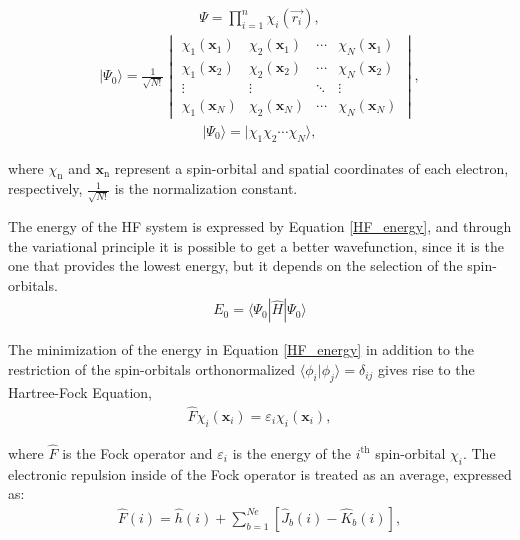 \begin{align}
  \Psi = \prod_{i=1}^{n} \chi_i (\vec{r_i}) ,
  \label{Aprox_Orb}
\end{align}
\begin{align}
  |\Psi_0\rangle = \frac{1}{\sqrt{N!}}
  \begin{vmatrix}
    \chi_{1}(\mathbf{x}_1) & \chi_{2}(\mathbf{x}_1) & \cdots & \chi_{N}(\mathbf{x}_1) \\
    \chi_{1}(\mathbf{x}_2) & \chi_{2}(\mathbf{x}_2) & \cdots & \chi_{N}(\mathbf{x}_2) \\
    \vdots & \vdots & \ddots & \vdots \\
    \chi_{1}(\mathbf{x}_N) & \chi_{2}(\mathbf{x}_N) & \cdots & \chi_{N}(\mathbf{x}_N)
  \end{vmatrix} ,
\label{det_s}
\end{align}
%
\begin{align}
  |\Psi_0\rangle = |\chi_{1}\chi_{2} \cdots \chi_{N} \rangle ,
\label{det_s_2}
\end{align}

\noindent where $\chi_\mathrm{n}$ and $\mathbf{x}_\mathrm{n}$ represent a
spin-orbital and spatial coordinates of each electron, respectively,
$\frac{1}{\sqrt{N!}}$ is the normalization constant.

The energy of the \gls{HF} system is expressed by Equation \ref{HF_energy}, and
through the variational principle it is possible to get a better wavefunction,
since it is the one that provides the lowest energy, but it depends on the
selection of the spin-orbitals.
%
\begin{align}
  E_0 = \langle \Psi_0 | \widehat{H} | \Psi_0 \rangle 
\label{HF_energy}
\end{align}

\newpage

The minimization of the energy in Equation \ref{HF_energy} in addition to the
restriction of the spin-orbitals orthonormalized
$\langle\phi_{i}|\phi_{j}\rangle = \delta_{ij}$ gives rise to the Hartree-Fock
Equation,
\begin{align}
  \widehat{F}\chi_{i}(\mathbf{x}_i)=\varepsilon_{i}\chi_{i}(\mathbf{x}_i),
\end{align}

\noindent where $\widehat{F}$ is the Fock operator and $\varepsilon_i$ is the
energy of the $i^{\mathrm{th}}$ spin-orbital $\chi_i$. The electronic repulsion
inside of the Fock operator is treated as an average, expressed as:
%
\begin{align} %
  \widehat{F} (i) = \widehat{h}(i) + \sum_{b=1}^{Ne} [\hat{J}_b (i) - \hat{K}_b (i)],
\end{align}

